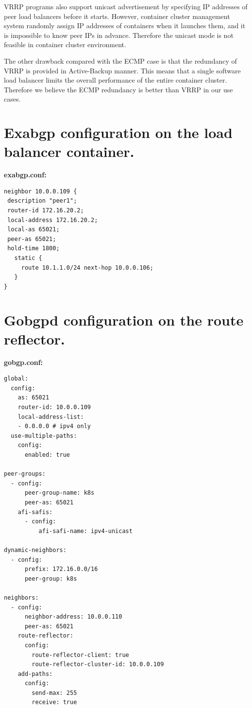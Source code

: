 VRRP programs also support unicast advertisement by specifying IP addresses of peer load balancers before it starts.
However, container cluster management system randomly assign IP addresses of containers when it launches them, and it is impossible to know peer IPs in advance. 
Therefore the unicast mode is not feasible in container cluster environment.

The other drawback compared with the ECMP case is that the redundancy of VRRP is provided in Active-Backup manner.
This means that a single software load balancer limits the overall performance of the entire container cluster.
Therefore we believe the ECMP redundancy is better than VRRP in our use cases.

\section{Exabgp configuration on the load balancer container.}
\label{appendix:exabgp_config}

{\bf\normalsize exabgp.conf:}
\begin{verbatim}
neighbor 10.0.0.109 {
 description "peer1";
 router-id 172.16.20.2;
 local-address 172.16.20.2;
 local-as 65021;
 peer-as 65021;
 hold-time 1800;
   static {
     route 10.1.1.0/24 next-hop 10.0.0.106;
   }
}
\end{verbatim}

\section{Gobgpd configuration on the route reflector.}
\label{appendix:route_reflector_config}

{\bf\normalsize gobgp.conf:}
\begin{verbatim}
global:
  config:
    as: 65021
    router-id: 10.0.0.109
    local-address-list:
    - 0.0.0.0 # ipv4 only
  use-multiple-paths:
    config:
      enabled: true

peer-groups:
  - config:
      peer-group-name: k8s
      peer-as: 65021
    afi-safis:
      - config:
          afi-safi-name: ipv4-unicast

dynamic-neighbors:
  - config:
      prefix: 172.16.0.0/16
      peer-group: k8s

neighbors:
  - config:
      neighbor-address: 10.0.0.110
      peer-as: 65021
    route-reflector:
      config:
        route-reflector-client: true
        route-reflector-cluster-id: 10.0.0.109
    add-paths: 
      config:
        send-max: 255
        receive: true

\end{verbatim}


